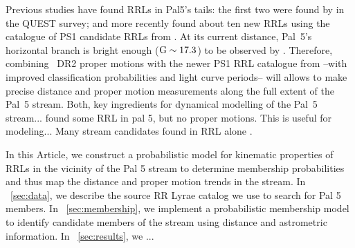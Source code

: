 \documentclass[twocolumn]{aastex63}
\begin{document}
Previous studies have found RRLs in Pal5's tails: the first two were found by \citet{Vivas:2001} in the QUEST survey; and more recently \citep{Ibata:2017} found about ten new RRLs using the catalogue of PS1 candidate RRLs from \citet{Hernitschek:2016}. At its current distance, Pal~5's horizontal branch is bright enough (${\mathrm{G}}\sim17.3$) to be observed by \Gaia. Therefore, combining \Gaia~DR2 proper motions with the newer PS1 RRL catalogue from \citet{Sesar:2017b} --with improved classification probabilities and light curve periods--  will allows to make precise distance and proper motion measurements along the full extent of the Pal~5 stream. Both, key ingredients for dynamical modelling of the Pal~5 stream...
\citep{Ibata:2017} found some RRL in pal 5, but no proper motions.
This is useful for modeling...
Many stream candidates found in RRL alone \citep{Mateu:2018}.


In this Article, we construct a probabilistic model for kinematic properties of RRLs in the vicinity of the Pal 5 stream to determine membership probabilities and thus map the distance and proper motion trends in the stream.
In \sectionname~\ref{sec:data}, we describe the source RR Lyrae catalog we use to search for Pal 5 members.
In \sectionname~\ref{sec:membership}, we implement a probabilistic membership model to identify candidate members of the stream using distance and astrometric information.
In \sectionname~\ref{sec:results}, we ...
\end{document}
